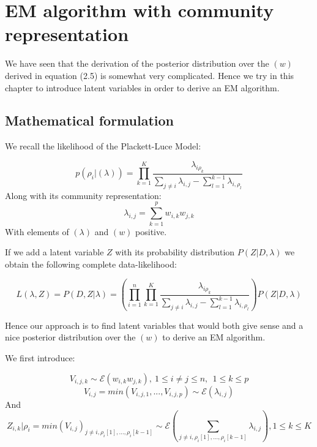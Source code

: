 \documentclass[12pt]{ociamthesis}  %
\begin{document}
	\chapter{EM algorithm with community representation}
	
	We have seen that the derivation of the posterior distribution over the $(w)$ derived in equation (2.5) is somewhat very complicated. Hence we try in this chapter to introduce latent variables in order to derive an EM algorithm.
	
	\section{Mathematical formulation}
	
	We recall the likelihood of the Plackett-Luce Model:
	
	\begin{equation}
	p(\rho_{i} | (\lambda)) = \prod_{k = 1}^{K}\frac{\lambda_{i\rho_{k}}}{\sum_{j \neq i}\lambda_{i,j} - \sum_{l = 1}^{k - 1}\lambda_{i,\rho_{l}}}
	\end{equation}
	Along with its community representation:
	\begin{equation}
	\lambda_{i,j} = \sum_{k = 1}^{p} w_{i,k} w_{j,k}
	\end{equation}
	With elements of $(\lambda)$ and $(w)$ positive.
	
	If we add a latent variable $Z$ with its probability distribution $P(Z | D, \lambda)$ we obtain the following complete data-likelihood:
	
	\begin{equation}
	L(\lambda,Z) = P(D,Z | \lambda) = (\prod_{i = 1}^{n}\prod_{k = 1}^{K}\frac{\lambda_{i\rho_{k}}}{\sum_{j \neq i}\lambda_{i,j} - \sum_{l = 1}^{k - 1}\lambda_{i,\rho_{l}}})P(Z | D, \lambda)
	\end{equation}
	
	Hence our approach is to find latent variables that would both give sense and a nice posterior distribution over the $(w)$ to derive an EM algorithm.
	
	We first introduce:
	
	\begin{equation}
	V_{i,j,k} \sim \mathcal{E}(w_{i,k}w_{j,k}), \ 1 \leq i \neq j \leq n, \ \ 1 \leq k \leq p
	\end{equation}
	\begin{equation}
	V_{i,j} = min(V_{i,j,1},...,V_{i,j,p}) \sim \mathcal{E}(\lambda_{i,j})
	\end{equation}
	And
	\begin{equation}
	Z_{i,k} | \rho_{i} = min(V_{i,j})_{j \neq i, \rho_{i}[1],...,\rho_{i}[k-1]} \sim \mathcal{E}(\sum_{j \neq i, \rho_{i}[1],...,\rho_{i}[k-1]}\lambda_{i,j}), 1 \leq k \leq K
	\end{equation}
	
\end{document}
